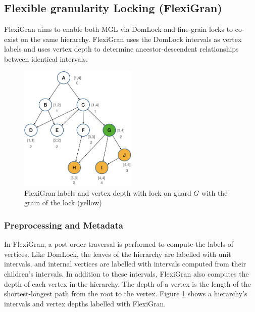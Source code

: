 \subsection{Flexible granularity Locking (FlexiGran)}

FlexiGran \cite{FlexiGran2024} aims to enable both MGL via DomLock and fine-grain locks to co-exist on the same hierarchy. 
FlexiGran uses the DomLock intervals as vertex labels and uses vertex depth to determine ancestor-descendent relationships between identical intervals.

\begin{figure}
    \centering
    \captionsetup{justification=centering}
    \includegraphics[width=0.5\textwidth]{figures/flexigran_example_with_lock.png}
    \caption{FlexiGran labels and vertex depth with lock on guard $G$ with the grain of the lock (yellow)}
    \label{fig:flexigran_example_locked}
\end{figure}

\subsubsection{Preprocessing and Metadata}

In FlexiGran, a post-order traversal is performed to compute the labels of vertices. Like DomLock, the leaves of the hierarchy are labelled with unit intervals, and internal vertices are labelled with intervals computed from their children's intervals. In addition to these intervals, FlexiGran also computes the depth of each vertex in the hierarchy. The depth of a vertex is the length of the shortest-longest path from the root to the vertex. Figure \ref{fig:flexigran_example_locked} shows a hierarchy's intervals and vertex depths labelled with FlexiGran.

